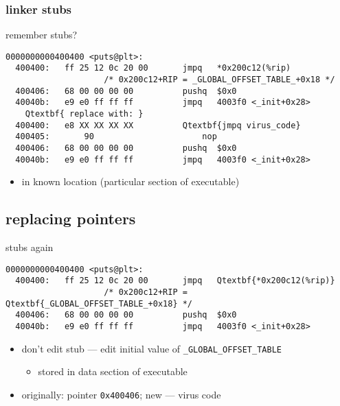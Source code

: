 \subsubsection{linker stubs}

\begin{frame}[fragile,label=stubReplace]{remember stubs?}
\begin{Verbatim}[commandchars=Q\{\},fontsize=\fontsize{8}{9}\selectfont]
0000000000400400 <puts@plt>:
  400400:	ff 25 12 0c 20 00    	jmpq   *0x200c12(%rip) 
                    /* 0x200c12+RIP = _GLOBAL_OFFSET_TABLE_+0x18 */
  400406:	68 00 00 00 00       	pushq  $0x0
  40040b:	e9 e0 ff ff ff       	jmpq   4003f0 <_init+0x28>
    Qtextbf{ replace with: }
  400400:	e8 XX XX XX XX          Qtextbf{jmpq virus_code}
  400405:       90                      nop
  400406:	68 00 00 00 00       	pushq  $0x0
  40040b:	e9 e0 ff ff ff       	jmpq   4003f0 <_init+0x28>
\end{Verbatim}
\begin{itemize}
    \item in known location (particular section of executable)
\end{itemize}
\end{frame}


\subsection{replacing pointers}


\begin{frame}[fragile,label=stubsReplacePtr]{stubs again}
\begin{Verbatim}[commandchars=Q\{\},fontsize=\fontsize{8}{9}\selectfont]
0000000000400400 <puts@plt>:
  400400:	ff 25 12 0c 20 00    	jmpq   Qtextbf{*0x200c12(%rip)}
                    /* 0x200c12+RIP = Qtextbf{_GLOBAL_OFFSET_TABLE_+0x18} */
  400406:	68 00 00 00 00       	pushq  $0x0
  40040b:	e9 e0 ff ff ff       	jmpq   4003f0 <_init+0x28>
\end{Verbatim}
\begin{itemize}
\item don't edit stub --- edit initial value of {\tt \_GLOBAL\_OFFSET\_TABLE}
    \begin{itemize}
    \item stored in data section of executable
    \end{itemize}
\item originally: pointer {\tt 0x400406}; new --- virus code
\end{itemize}
\end{frame}

